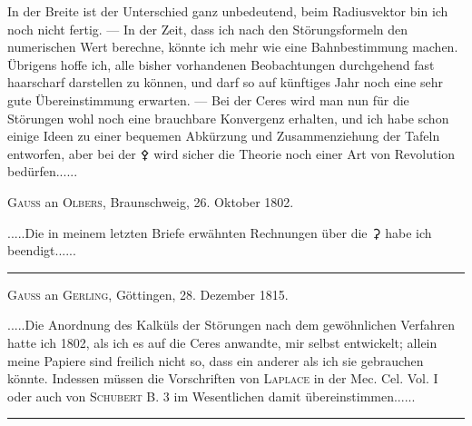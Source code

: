 \par
\noindent\hspace*{\parindent}In der Breite ist der Unterschied ganz unbedeutend, beim Radiusvektor bin ich noch nicht fertig. — In der Zeit, dass ich nach den Störungsformeln den numerischen Wert berechne, könnte ich mehr wie eine Bahnbestimmung machen. Übrigens hoffe ich, alle bisher vorhandenen Beobachtungen durchgehend fast haarscharf darstellen zu können, und darf so auf künftiges Jahr noch eine sehr gute Übereinstimmung erwarten. — Bei der Ceres wird man nun für die Störungen wohl noch eine brauchbare Konvergenz erhalten, und ich habe schon einige Ideen zu einer bequemen Abkürzung und Zusammenziehung der Tafeln entworfen, aber bei der {\AstroSymbols ⚴} wird sicher die Theorie noch einer Art von Revolution bedürfen.\quad.\quad.\quad.\quad.\quad.
\par\bigskip
\begin{center}\textsc{Gauss} an \textsc{Olbers}, Braunschweig, 26. Oktober 1802.\end{center}
\noindent\hspace*{\parindent}.\quad.\quad.\quad.\quad.\quad Die in meinem letzten Briefe erwähnten Rechnungen über die {\AstroSymbols ⚳} habe ich beendigt.\quad.\quad.\quad.\quad.\quad.
\par\medskip
\begin{center}\rule{.27\linewidth}{.4pt}\end{center}
\par\bigskip
\begin{center}\textsc{Gauss} an \textsc{Gerling}, Göttingen, 28. Dezember 1815.\end{center}
\noindent\hspace*{\parindent}.\quad.\quad.\quad.\quad.\quad Die Anordnung des Kalküls der Störungen nach dem gewöhnlichen Verfahren hatte ich 1802, als ich es auf die Ceres anwandte, mir selbst entwickelt; allein meine Papiere sind freilich nicht so, dass ein anderer als ich sie gebrauchen könnte. Indessen müssen die Vorschriften von \textsc{Laplace} in der Mec. Cel. Vol. I oder auch von \textsc{Schubert} B. 3 im Wesentlichen damit übereinstimmen.\quad.\quad.\quad.\quad.\quad.
\par\medskip
\begin{center}\rule{.27\linewidth}{.4pt}\end{center}
